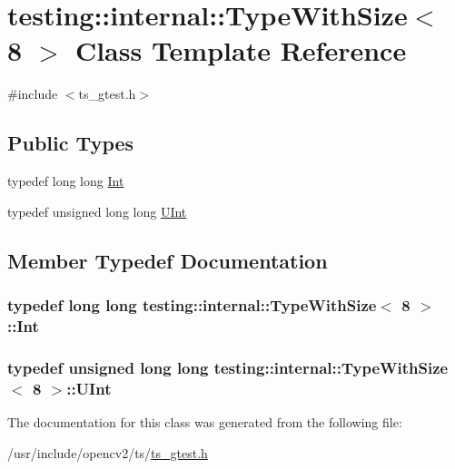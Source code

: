 \hypertarget{classtesting_1_1internal_1_1TypeWithSize_3_018_01_4}{\section{testing\-:\-:internal\-:\-:Type\-With\-Size$<$ 8 $>$ Class Template Reference}
\label{classtesting_1_1internal_1_1TypeWithSize_3_018_01_4}
}


{\ttfamily \#include $<$ts\-\_\-gtest.\-h$>$}

\subsection*{Public Types}
\begin{DoxyCompactItemize}
\item 
typedef long long \hyperlink{classtesting_1_1internal_1_1TypeWithSize_3_018_01_4_a36d5697e5f5254b0495f13c97d747e36}{Int}
\item 
typedef unsigned long long \hyperlink{classtesting_1_1internal_1_1TypeWithSize_3_018_01_4_a747e21c5aee8faf07ec65cd4c3d1ca62}{U\-Int}
\end{DoxyCompactItemize}


\subsection{Member Typedef Documentation}
\hypertarget{classtesting_1_1internal_1_1TypeWithSize_3_018_01_4_a36d5697e5f5254b0495f13c97d747e36}{
\subsubsection[{Int}]{\setlength{\rightskip}{0pt plus 5cm}typedef long long {\bf testing\-::internal\-::\-Type\-With\-Size}$<$ 8 $>$\-::{\bf Int}}}\label{classtesting_1_1internal_1_1TypeWithSize_3_018_01_4_a36d5697e5f5254b0495f13c97d747e36}
\hypertarget{classtesting_1_1internal_1_1TypeWithSize_3_018_01_4_a747e21c5aee8faf07ec65cd4c3d1ca62}{
\subsubsection[{U\-Int}]{\setlength{\rightskip}{0pt plus 5cm}typedef unsigned long long {\bf testing\-::internal\-::\-Type\-With\-Size}$<$ 8 $>$\-::{\bf U\-Int}}}\label{classtesting_1_1internal_1_1TypeWithSize_3_018_01_4_a747e21c5aee8faf07ec65cd4c3d1ca62}


The documentation for this class was generated from the following file\-:\begin{DoxyCompactItemize}
\item 
/usr/include/opencv2/ts/\hyperlink{ts__gtest_8h}{ts\-\_\-gtest.\-h}\end{DoxyCompactItemize}
